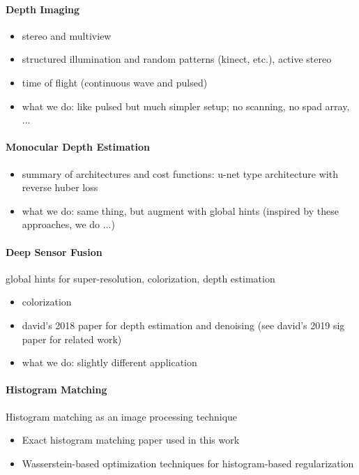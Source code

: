 \paragraph{Depth Imaging}

\begin{itemize}
	\item stereo and multiview
	\item structured illumination and random patterns (kinect, etc.), active stereo
	\item time of flight (continuous wave and pulsed)
	\item what we do: like pulsed but much simpler setup; no scanning, no spad array, ...
\end{itemize}


\paragraph{Monocular Depth Estimation}

\begin{itemize}
	\item summary of architectures and cost functions: u-net type architecture with reverse huber loss
	\item what we do: same thing, but augment with global hints (inspired by these approaches, we do ...)
\end{itemize}

\paragraph{Deep Sensor Fusion}

global hints for super-resolution, colorization, depth estimation 
%
\begin{itemize}
	\item colorization
	\item david's 2018 paper for depth estimation and denoising (see david's 2019 sig paper for related work)
	\item what we do: slightly different application
\end{itemize}

\paragraph{Histogram Matching}

Histogram matching as an image processing technique
%
\begin{itemize}
  \item Exact histogram matching paper used in this work
  \item Wasserstein-based optimization techniques for
    histogram-based regularization
\end{itemize}


